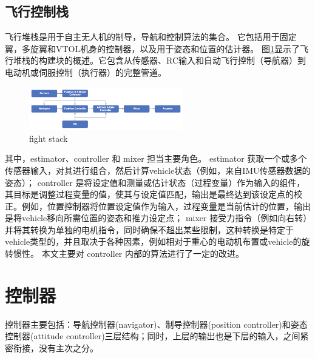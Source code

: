 \documentclass[UTF8,a4paper,10pt,nocolorlinks]{ctexart}
\begin{document}
    \subsection{飞行控制栈}    
    飞行堆栈是用于自主无人机的制导，导航和控制算法的集合。 
    它包括用于固定翼，多旋翼和VTOL机身的控制器，以及用于姿态和位置的估计器。
图\ref{fight}显示了飞行堆栈的构建块的概述。它包含从传感器、RC输入和自动飞行控制（导航器）到电动机或伺服控制（执行器）的完整管道。
\begin{figure}[H]
    \centering
    \includegraphics[width=0.6\textwidth]{picture/fight_stack.png}
    \caption{fight stack}
    \label{fight}
\end{figure}
其中，estimator、controller 和 mixer 担当主要角色。
estimator 获取一个或多个传感器输入，对其进行组合，然后计算vehicle状态（例如，来自IMU传感器数据的姿态）；
controller 是将设定值和测量或估计状态（过程变量）作为输入的组件，其目标是调整过程变量的值，使其与设定值匹配，输出是最终达到该设定点的校正。例如，位置控制器将位置设定值作为输入，过程变量是当前估计的位置，输出是将vehicle移向所需位置的姿态和推力设定点；
mixer 接受力指令（例如向右转）并将其转换为单独的电机指令，同时确保不超出某些限制，这种转换是特定于vehicle类型的，并且取决于各种因素，例如相对于重心的电动机布置或vehicle的旋转惯性。
本文主要对 controller 内部的算法进行了一定的改进。
    \section{控制器}
    控制器主要包括：导航控制器(navigator)、制导控制器(position controller)和姿态控制器(attitude controller)三层结构；同时，上层的输出也是下层的输入，之间紧密衔接，没有主次之分。
\end{document}
